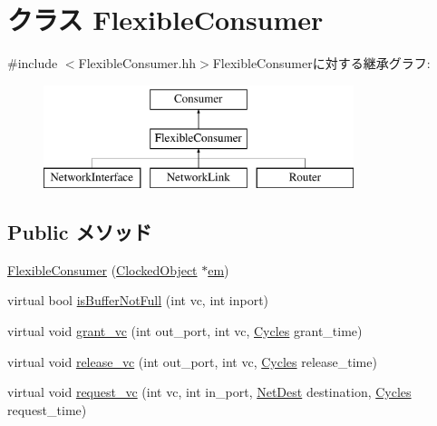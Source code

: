 \hypertarget{classFlexibleConsumer}{
\section{クラス FlexibleConsumer}
\label{classFlexibleConsumer}
}


{\ttfamily \#include $<$FlexibleConsumer.hh$>$}FlexibleConsumerに対する継承グラフ:\begin{figure}[H]
\begin{center}
\leavevmode
\includegraphics[height=3cm]{classFlexibleConsumer}
\end{center}
\end{figure}
\subsection*{Public メソッド}
\begin{DoxyCompactItemize}
\item 
\hyperlink{classFlexibleConsumer_a1de35851711ba03b6671e2a06929fc1c}{FlexibleConsumer} (\hyperlink{classClockedObject}{ClockedObject} $\ast$\hyperlink{classConsumer_a75e14198badfddb1422adb9833fbd275}{em})
\item 
virtual bool \hyperlink{classFlexibleConsumer_aa3732d20c1f3f94fb27ef60ac660f363}{isBufferNotFull} (int vc, int inport)
\item 
virtual void \hyperlink{classFlexibleConsumer_a775e8414113748731990f3979cdd4632}{grant\_\-vc} (int out\_\-port, int vc, \hyperlink{classCycles}{Cycles} grant\_\-time)
\item 
virtual void \hyperlink{classFlexibleConsumer_a54d4f8948ced53110ed96024a64adf7e}{release\_\-vc} (int out\_\-port, int vc, \hyperlink{classCycles}{Cycles} release\_\-time)
\item 
virtual void \hyperlink{classFlexibleConsumer_aa0ffe58ceb5a05129736d59f3eeabcf0}{request\_\-vc} (int vc, int in\_\-port, \hyperlink{classNetDest}{NetDest} destination, \hyperlink{classCycles}{Cycles} request\_\-time)
\end{DoxyCompactItemize}


